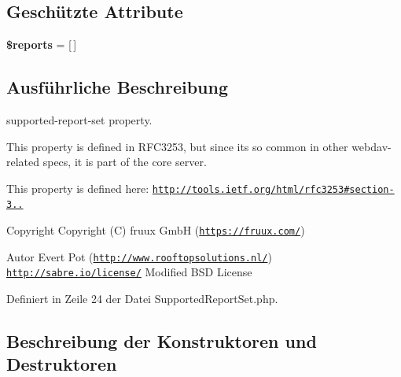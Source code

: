 \subsection*{Geschützte Attribute}
\begin{DoxyCompactItemize}
\item 
\mbox{\label{class_sabre_1_1_d_a_v_1_1_xml_1_1_property_1_1_supported_report_set_a82f294f7175f851763c0b14faeedd530}} 
{\bfseries \$reports} = \mbox{[}$\,$\mbox{]}
\end{DoxyCompactItemize}


\subsection{Ausführliche Beschreibung}
supported-\/report-\/set property.

This property is defined in R\+F\+C3253, but since it\textquotesingle{}s so common in other webdav-\/related specs, it is part of the core server.

This property is defined here\+: \href{http://tools.ietf.org/html/rfc3253#section-3.1.5}{\tt http\+://tools.\+ietf.\+org/html/rfc3253\#section-\/3..}

\begin{DoxyCopyright}{Copyright}
Copyright (C) fruux GmbH (\href{https://fruux.com/}{\tt https\+://fruux.\+com/}) 
\end{DoxyCopyright}
\begin{DoxyAuthor}{Autor}
Evert Pot (\href{http://www.rooftopsolutions.nl/}{\tt http\+://www.\+rooftopsolutions.\+nl/})  \href{http://sabre.io/license/}{\tt http\+://sabre.\+io/license/} Modified B\+SD License 
\end{DoxyAuthor}


Definiert in Zeile 24 der Datei Supported\+Report\+Set.\+php.



\subsection{Beschreibung der Konstruktoren und Destruktoren}
\mbox{\label{class_sabre_1_1_d_a_v_1_1_xml_1_1_property_1_1_supported_report_set_ad9bafafe7287d6567afd8f1bb531fc4e}} 
